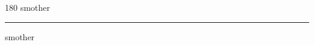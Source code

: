 
\begin{frame}
\begin{center}
\begin{turn}{180}
{\fontsize{2.5cm}{1em}\selectfont smother}
\end{turn}
\vspace{1em}\par  
\hrule
\vspace{1em}\par  
{\fontsize{2.5cm}{1em}\selectfont smother}
\end{center}
\end{frame}
